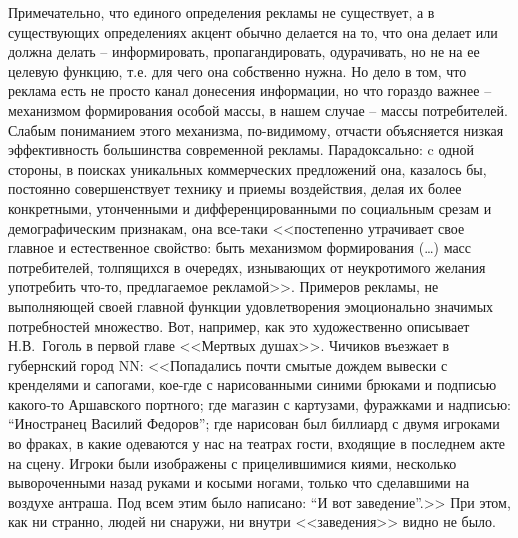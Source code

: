 Примечательно, что единого определения рекламы не существует, а в существующих
определениях акцент обычно делается на то, что она делает или должна делать --
информировать, пропагандировать, одурачивать, но не на ее целевую функцию, т.е.
для чего она собственно нужна. Но дело в том, что реклама есть не просто канал
донесения информации, но что гораздо важнее -- механизмом формирования особой массы,
в нашем случае -- массы потребителей. Слабым пониманием этого механизма, по-видимому,
отчасти объясняется низкая эффективность большинства современной рекламы.
Парадоксально: c одной стороны, в поисках уникальных коммерческих предложений
она, казалось бы, постоянно совершенствует технику и приемы воздействия,
делая их более конкретными, утонченными и дифференцированными по социальным
срезам и демографическим признакам, она все-таки <<постепенно утрачивает свое
главное и естественное свойство: быть механизмом формирования (\ldots) масс
потребителей, толпящихся в очередях, изнывающих от неукротимого желания
употребить что-то, предлагаемое рекламой>>.\autocite[][312]{olshansky} Примеров
рекламы, не выполняющей своей главной функции удовлетворения эмоционально
значимых потребностей множество. Вот, например, как это художественно описывает
Н.В.~Гоголь в первой главе <<Мертвых душах>>. Чичиков въезжает в губернский город NN:
<<Попадались почти смытые дождем вывески с кренделями и сапогами, кое-где с
нарисованными синими брюками и подписью какого-то Аршавского портного;
где магазин с картузами, фуражками и надписью: ``Иностранец Василий Федоров'';
где нарисован был биллиард с двумя игроками во фраках, в какие одеваются
у нас на театрах гости, входящие в последнем акте на сцену.
Игроки были изображены с прицелившимися киями, несколько вывороченными
назад руками и косыми ногами, только что сделавшими на воздухе антраша.
Под всем этим было написано: ``И вот заведение''.>>\autocite{gogol2006}
При этом, как ни странно, людей ни снаружи, ни внутри <<заведения>> видно не было.

